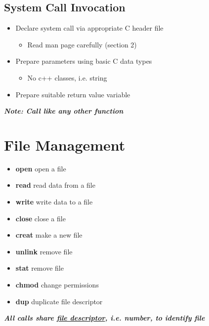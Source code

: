 \documentclass{report}
\begin{document}
  \subsection{System Call Invocation} 
  \begin{itemize}
    \item Declare system call via appropriate C header file
      \begin{itemize}[label=$\circ$]
        \item Read man page carefully (section 2)
      \end{itemize}
    \item Prepare parameters using basic C data types
      \begin{itemize}[label=$\circ$]
        \item No c++ classes, i.e. string
      \end{itemize}
    \item Prepare suitable return value variable
  \end{itemize}
  \textit{\textbf{Note: Call like any other function}}
  \section{File Management}
  \begin{itemize}
    \item \textbf{open} \hspace{6.5mm} open a file
    \item \textbf{read} \hspace{6.5mm} read data from a file
    \item \textbf{write} \hspace{5.5mm} write data to a file
    \item \textbf{close} \hspace{6.5mm} close a file
    \item \textbf{creat} \hspace{6.5mm} make a new file
    \item \textbf{unlink} \hspace{5mm} remove file
    \item \textbf{stat} \hspace{10mm} remove file
    \item \textbf{chmod} \hspace{5mm} change permissions
    \item \textbf{dup} \hspace{10mm} duplicate file descriptor
  \end{itemize}
  \textit{\textbf{All calls share \underline{file descriptor}, i.e. number, to identify file}}
  \newpage
\end{document}

